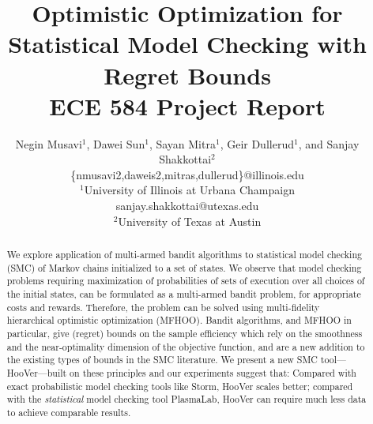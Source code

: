 \documentclass[11pt]{article}
\theoremstyle{definition}
\newcommand{\sayan}[1]{\textcolor{blue}{#1}}
\newcommand{\toolname}{{{\sf HooVer}\xspace}}
\begin{document}
\title{Optimistic Optimization for Statistical Model Checking with Regret Bounds\\ ECE 584 Project Report}
\author{Negin Musavi$^1$, Dawei Sun$^1$, Sayan Mitra$^1$, Geir Dullerud$^1$, and Sanjay Shakkottai$^2$
\\
{\{nmusavi2,daweis2,mitras,dullerud\}@illinois.edu} \\ ${}^1$University of Illinois at Urbana Champaign \\
sanjay.shakkottai@utexas.edu
\\ ${}^2$University of Texas  at Austin}


\maketitle


%
\begin{abstract}
We explore application of multi-armed bandit algorithms to  statistical model checking (SMC) of Markov chains initialized to a set of states.
%
We observe that model checking problems requiring  maximization of probabilities of sets of execution over all choices of the initial states, can be formulated as a multi-armed bandit problem, for appropriate costs and rewards. Therefore, the problem can be solved using   multi-fidelity hierarchical optimistic optimization (MFHOO).
%
%
Bandit algorithms, and MFHOO in particular, give  (regret) bounds on the sample efficiency  which rely on the  smoothness and the near-optimality dimension of the objective function, and are a new addition to the existing types of bounds in the SMC literature.
%
We present  a new SMC tool---\toolname{}---built  on these principles and  our experiments suggest that:  Compared with exact probabilistic model checking tools like Storm, \toolname{} scales better; compared with the {\em statistical} model checking tool PlasmaLab, \toolname{} can require much less data to achieve comparable results.
\end{abstract}
\end{document}
